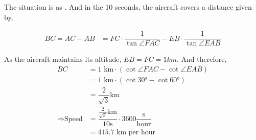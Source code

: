 \begin{solution}
	The situation is as \asif. And in the 10 seconds, the aircraft covers 
	a distance given by, 
	
	\begin{align}
		BC = AC - AB &= FC\cdot\dfrac{1}{\tan\angle{FAC}} - EB\cdot\dfrac{1}{\tan\angle{EAB}}
	\end{align}
	
	As the aircraft maintains its altitude, $EB = FC = 1km$. And therefore, 
	\begin{align}
		BC &= \text{1 km}\cdot\left(\cot\angle{FAC} - \cot\angle{EAB}\right) \\
		   &= \text{1 km}\cdot\left(\cot\ang{30} - \cot\ang{60}\right) \\
		   &= \dfrac{2}{\sqrt{3}}\text{km} \\
		\Rightarrow \text{Speed} &= \dfrac{\frac{2}{\sqrt{3}}\text{km}}{10\text{s}}\cdot 3600\dfrac{\text{s}}{\text{hour}} \\
		   &= 415.7\text{ km per hour}
	\end{align}
\end{solution}
